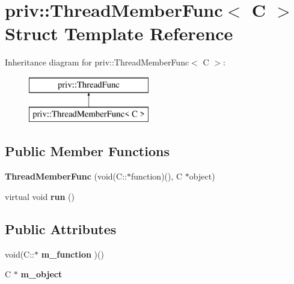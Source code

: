\hypertarget{structpriv_1_1ThreadMemberFunc}{\section{priv\-:\-:Thread\-Member\-Func$<$ C $>$ Struct Template Reference}
\label{structpriv_1_1ThreadMemberFunc}
}
Inheritance diagram for priv\-:\-:Thread\-Member\-Func$<$ C $>$\-:\begin{figure}[H]
\begin{center}
\leavevmode
\includegraphics[height=2.000000cm]{structpriv_1_1ThreadMemberFunc}
\end{center}
\end{figure}
\subsection*{Public Member Functions}
\begin{DoxyCompactItemize}
\item 
\hypertarget{structpriv_1_1ThreadMemberFunc_ae44619c4cf6d886da6f32a1de37d652e}{{\bfseries Thread\-Member\-Func} (void(C\-::$\ast$function)(), C $\ast$object)}\label{structpriv_1_1ThreadMemberFunc_ae44619c4cf6d886da6f32a1de37d652e}

\item 
\hypertarget{structpriv_1_1ThreadMemberFunc_abbd440e93edf2747cf9cdde579bc5de0}{virtual void {\bfseries run} ()}\label{structpriv_1_1ThreadMemberFunc_abbd440e93edf2747cf9cdde579bc5de0}

\end{DoxyCompactItemize}
\subsection*{Public Attributes}
\begin{DoxyCompactItemize}
\item 
\hypertarget{structpriv_1_1ThreadMemberFunc_a237f80d81258c6553fd18e86880ab6c4}{void(C\-::$\ast$ {\bfseries m\-\_\-function} )()}\label{structpriv_1_1ThreadMemberFunc_a237f80d81258c6553fd18e86880ab6c4}

\item 
\hypertarget{structpriv_1_1ThreadMemberFunc_a849dd2e31c95e699fb316065d9d75116}{C $\ast$ {\bfseries m\-\_\-object}}\label{structpriv_1_1ThreadMemberFunc_a849dd2e31c95e699fb316065d9d75116}

\end{DoxyCompactItemize}


